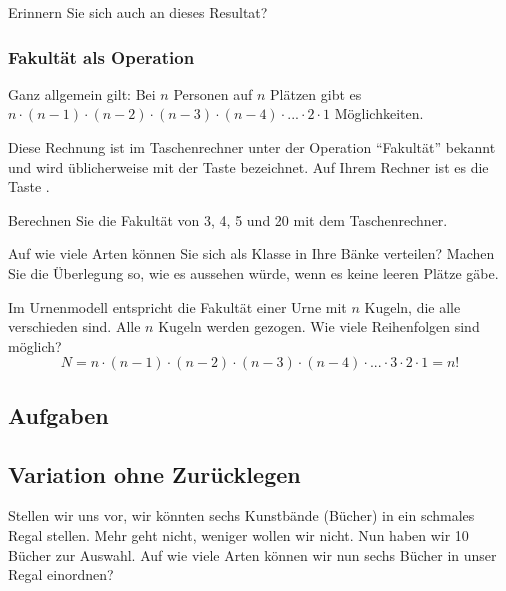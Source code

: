 Erinnern Sie sich auch an dieses Resultat? 


\newpage

\subsubsection{Fakultät als Operation}
Ganz allgemein gilt: Bei $n$ Personen auf $n$ Plätzen gibt es
$n\cdot{} (n-1) \cdot{} (n-2) \cdot{} (n-3) \cdot{} (n-4) \cdot{}
... \cdot{} 2 \cdot{} 1$ Möglichkeiten.

Diese Rechnung ist im Taschenrechner unter der Operation ``Fakultät''
bekannt und wird üblicherweise mit der Taste  bezeichnet. Auf
Ihrem Rechner ist es die Taste .

Berechnen Sie die Fakultät von 3, 4, 5 und 20 mit dem Taschenrechner.


Auf wie viele Arten können Sie sich als Klasse in Ihre Bänke
verteilen? Machen Sie die Überlegung so, wie es aussehen würde, wenn es keine leeren Plätze gäbe.


\begin{gesetz}{}{}
Im Urnenmodell entspricht die Fakultät einer Urne mit $n$ Kugeln, die
alle verschieden sind. Alle $n$ Kugeln werden gezogen. Wie viele
Reihenfolgen sind möglich?
$$N = n\cdot{} (n-1) \cdot{} (n-2) \cdot{} (n-3) \cdot{}
(n-4) \cdot{} ... \cdot{} 3\cdot{} 2 \cdot{} 1 = n!$$
\end{gesetz}

\subsection*{Aufgaben}
\newpage


\subsection{Variation ohne Zurücklegen}
Stellen wir uns vor, wir könnten sechs Kunstbände (Bücher) in ein schmales
Regal stellen. Mehr geht nicht, weniger wollen wir nicht.
Nun haben wir 10 Bücher zur Auswahl. Auf wie viele Arten können wir nun sechs Bücher in unser Regal einordnen?

